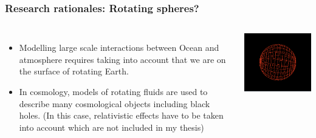 \documentclass[xcolor=dvipsnames,leqno]{beamer}
\begin{document}
\begin{frame}
\frametitle{Research rationales: Rotating spheres?}
\begin{columns}
\begin{itemize}
	\item Modelling large scale interactions between Ocean and atmosphere requires taking into account that we are on the surface of rotating Earth. 
	\item In cosmology, models of rotating fluids are used to describe many cosmological objects including black holes. (In this case, relativistic effects have to be taken into account which are not included in my thesis)
\end{itemize}
\includegraphics[scale=0.5]{Moving-Sphere.png}
\end{columns}
\end{frame}
\end{document}
